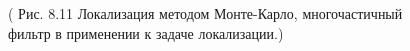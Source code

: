 \documentclass[10pt,a4paper]{article}
\begin{document}
\begin{figure}[H]
	\caption{ ( Рис. 8.11 Локализация методом Монте-Карло, многочастичный фильтр в применении к задаче локализации.)}
	\label{fig:811orig}
\end{figure}
\end{document}
